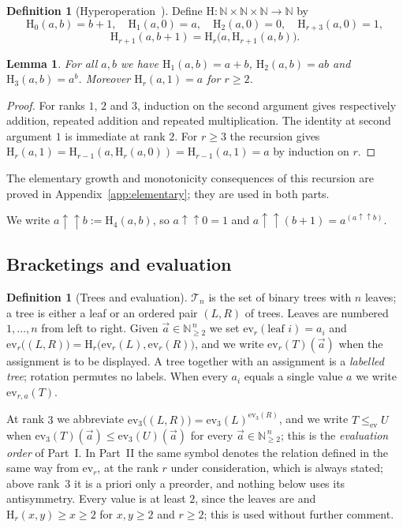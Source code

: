 \documentclass[11pt,a4paper]{article}
\theoremstyle{plain}
\newtheorem{lemma}[theorem]{Lemma}
\theoremstyle{definition}
\newtheorem{definition}[theorem]{Definition}
\newcommand{\HH}{\mathrm{H}}
\newcommand{\N}{\mathbb{N}}
\newcommand{\tw}{\uparrow\uparrow}
\newcommand{\ev}{\mathrm{ev}}
\newcommand{\Tam}{\mathcal{T}}
\begin{document}
\begin{definition}[Hyperoperation~\cite{Good}]\label{def:hyper}
Define $\HH:\N\times\N\times\N\to\N$ by
\[
\HH_0(a,b)=b+1,\quad
\HH_1(a,0)=a,\quad
\HH_2(a,0)=0,\quad
\HH_{r+3}(a,0)=1,
\]
\[
\HH_{r+1}(a,b+1)=\HH_{r}\bigl(a,\HH_{r+1}(a,b)\bigr).
\]
\end{definition}

\begin{lemma}\label{lem:conv}
For all $a,b$ we have $\HH_1(a,b)=a+b$, $\HH_2(a,b)=ab$ and $\HH_3(a,b)=a^{b}$.
Moreover $\HH_r(a,1)=a$ for $r\ge2$.
\end{lemma}

\begin{proof}
For ranks $1$, $2$ and $3$, induction on the second argument gives respectively
addition, repeated addition and repeated multiplication. The identity at second
argument $1$ is immediate at rank $2$. For $r\ge3$ the recursion gives
$\HH_r(a,1)=\HH_{r-1}(a,\HH_r(a,0))=\HH_{r-1}(a,1)=a$ by induction on $r$.
\end{proof}

The elementary growth and monotonicity consequences of this recursion are proved in
Appendix~\ref{app:elementary}; they are used in both parts.

We write $a\tw b:=\HH_4(a,b)$, so $a\tw 0=1$ and $a\tw(b+1)=a^{(a\tw b)}$.

\subsection{Bracketings and evaluation}

\begin{definition}[Trees and evaluation]\label{def:trees}
$\Tam_n$ is the set of binary trees with $n$ leaves; a tree is either a leaf or an
ordered pair $(L,R)$ of trees. Leaves are numbered $1,\dots,n$ from left to right.
Given $\vec a\in\N_{\ge2}^{\,n}$ we set $\ev_r(\text{leaf }i)=a_i$ and
$\ev_r\bigl((L,R)\bigr)=\HH_r\bigl(\ev_r(L),\ev_r(R)\bigr)$, and we write
$\ev_r(T)(\vec a)$ when the assignment is to be displayed. A tree together with an
assignment is a \emph{labelled tree}; rotation permutes no labels. When every $a_i$
equals a single value $a$ we write $\ev_{r,a}(T)$.
\end{definition}

At rank $3$ we abbreviate $\ev_3\bigl((L,R)\bigr)=\ev_3(L)^{\ev_3(R)}$, and we write
$T\le_{\ev}U$ when $\ev_3(T)(\vec a)\le\ev_3(U)(\vec a)$ for every
$\vec a\in\N_{\ge2}^{\,n}$; this is the \emph{evaluation order} of Part~I. In Part~II the
same symbol denotes the relation defined in the same way from $\ev_r$, at the rank $r$ under
consideration, which is always stated; above rank~$3$ it is a priori only a preorder, and
nothing below uses its antisymmetry. Every value
is at least $2$, since the leaves are and $\HH_r(x,y)\ge x\ge2$ for $x,y\ge2$ and
$r\ge2$; this is used without further comment.
\end{document}
